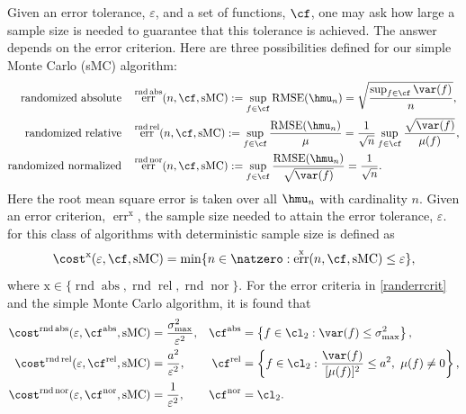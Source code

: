 \documentclass[12pt]{amsart}
\DeclareMathOperator{\RMSE}{RMSE}
\DeclareMathOperator{\rnd}{rnd}
\DeclareMathOperator{\abso}{abs}
\DeclareMathOperator{\rel}{rel}
\DeclareMathOperator{\nor}{nor}
\DeclareMathOperator{\err}{err}
\DeclareMathOperator{\sMC}{sMC}
\begin{document}
Given an error tolerance, $\varepsilon$, and a set of functions, $\cf$, one may ask how large a sample size is needed to guarantee that this tolerance is achieved.  The answer depends on the error criterion.  Here are three possibilities defined for our simple Monte Carlo (sMC) algorithm:
\begin{subequations} \label{randerrcrit}
\begin{align}
\text{randomized absolute} \quad & 
\err^{\rnd\abso}(n,\cf,\sMC) := \sup_{f \in \cf} \RMSE(\hmu_n) =  \sqrt{\frac{\sup_{f \in \cf}\var(f)}{n}},\\
\text{randomized relative} \quad & 
\err^{\rnd\rel}(n,\cf,\sMC) := \sup_{f \in \cf} \frac{\RMSE(\hmu_n)} {\mu}=  \frac{1}{\sqrt{n}} \sup_{f \in \cf} \frac{\sqrt{\var(f)}}{\mu(f)} , \\
\text{randomized normalized} \quad & 
\err^{\rnd\nor}(n,\cf,\sMC) := \sup_{f \in \cf} \frac{\RMSE(\hmu_n)} {\sqrt{\var(f)}} =  \frac{1}{\sqrt{n}}.
\end{align}
\end{subequations}
Here the root mean square error is taken over all $\hmu_n$ with cardinality $n$.  Given an error criterion, $\err^{\text{x}}$, the sample size needed to attain the error tolerance, $\varepsilon$. for this class of algorithms with deterministic sample size is defined as 
\[
\cost^{\text{x}}(\varepsilon,\cf,\sMC) = \min \{{n \in \natzero} :  \err^{\text{x}}(n,\cf,\sMC) \le \varepsilon\},
\]
where $\text{x} \in \{\rnd\abso, \rnd\rel, \rnd\nor\}$.
For the error criteria in \eqref{randerrcrit} and the simple Monte Carlo algorithm, it is found that 
\begin{subequations} \label{randerrcritsample}
\begin{align}
\cost^{\rnd\abso}(\varepsilon,\cf^{\abso},\sMC) &= \frac{\sigma^2_{\max}} {\varepsilon^2}, & \cf^{\abso} &= \left\{f \in \cl_2 : \var(f) \le \sigma^2_{\max} \right\},\\
\cost^{\rnd\rel}(\varepsilon,\cf^{\rel},\sMC) & = \frac{a^2} {\varepsilon^2}, & \cf^{\rel} &= \left\{f \in \cl_2 : \frac{\var(f)}{[\mu(f)]^2} \le a^2,\ \mu(f) \ne 0 \right\}, \\
\cost^{\rnd\nor}(\varepsilon,\cf^{\nor},\sMC) & = \frac{1} {\varepsilon^2}, & \cf^{\nor} &= \cl_2.
\end{align}
\end{subequations}
\end{document}
